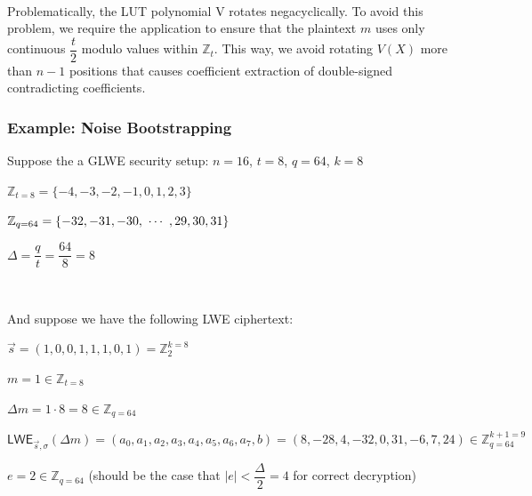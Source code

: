\begin{tcolorbox}[title={\textbf{\tboxlabel{\ref*{subsec:tfhe-summary}} TFHE Noise Bootstrapping Procedure}}]
\begin{enumerate}



\end{enumerate}

$ $

 Problematically, the LUT polynomial V rotates negacyclically. To avoid this problem, we require the application to ensure that the plaintext $m$ uses only continuous $\dfrac{t}{2}$ modulo values within $\mathbb{Z}_t$. This way, we avoid rotating $V(X)$ more than $n-1$ positions that causes coefficient extraction of double-signed contradicting coefficients. 
\end{tcolorbox}


\subsubsection{Example: Noise Bootstrapping}
\label{subsec:tfhe-noise-bootstrapping-ex}

Suppose the a GLWE security setup: $n = 16$, $t = 8$, $q = 64$, $k = 8$

$\mathbb{Z}_{t=8} = \{-4, -3, -2, -1, 0 , 1, 2, 3\}$

$\mathbb{Z}_{q=64} = \{ -32, -31, -30, \text{ } \text{$\cdots$} \text{ }, 29, 30, 31 \}$

$\Delta = \dfrac{q}{t} = \dfrac{64}{8} = 8$

$ $

And suppose we have the following LWE ciphertext:

$\vec{s} = (1, 0, 0, 1, 1, 1, 0, 1) = \mathbb{Z}_2^{k=8}$

$m = 1  \in \mathbb{Z}_{t=8}$

$\Delta m = 1 \cdot 8 = 8 \in \mathbb{Z}_{q=64}$



$\textsf{LWE}_{\vec{s}, \sigma}(\Delta m) = (a_0, a_1, a_2, a_3, a_4, a_5, a_6, a_7, b) 
= (8, -28, 4, -32, 0, 31, -6, 7, 24) \in \mathbb{Z}_{q=64}^{k+1=9}$

$e = 2 \in \mathbb{Z}_{q=64}$ (should be the case that $|e| < \dfrac{\Delta}{2} = 4$ for correct decryption)

